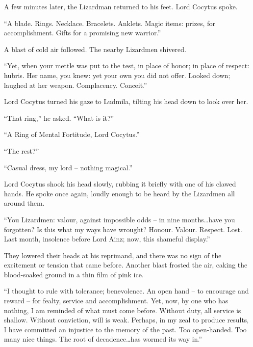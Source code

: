  

A few minutes later, the Lizardman returned to his feet. Lord Cocytus spoke.

 

“A blade. Rings. Necklace. Bracelets. Anklets. Magic items: prizes, for accomplishment. Gifts for a promising new warrior.”

 

A blast of cold air followed. The nearby Lizardmen shivered.

 

“Yet, when your mettle was put to the test, in place of honor; in place of respect: hubris. Her name, you knew: yet your own you did not offer. Looked down; laughed at her weapon. Complacency. Conceit.”

 

Lord Cocytus turned his gaze to Ludmila, tilting his head down to look over her.

 

“That ring,” he asked. “What is it?”

 

“A Ring of Mental Fortitude, Lord Cocytus.”

 

“The rest?”

 

“Casual dress, my lord – nothing magical.”

 

Lord Cocytus shook his head slowly, rubbing it briefly with one of his clawed hands. He spoke once again, loudly enough to be heard by the Lizardmen all around them.

 

“You Lizardmen: valour, against impossible odds – in nine months…have you forgotten? Is this what my ways have wrought? Honour. Valour. Respect. Lost. Last month, insolence before Lord Ainz; now, this shameful display.”

 

They lowered their heads at his reprimand, and there was no sign of the excitement or tension that came before. Another blast frosted the air, caking the blood-soaked ground in a thin film of pink ice.

 

“I thought to rule with tolerance; benevolence. An open hand – to encourage and reward – for fealty, service and accomplishment. Yet, now, by one who has nothing, I am reminded of what must come before. Without duty, all service is shallow. Without conviction, will is weak. Perhaps, in my zeal to produce results, I have committed an injustice to the memory of the past. Too open-handed. Too many nice things. The root of decadence…has wormed its way in.”

